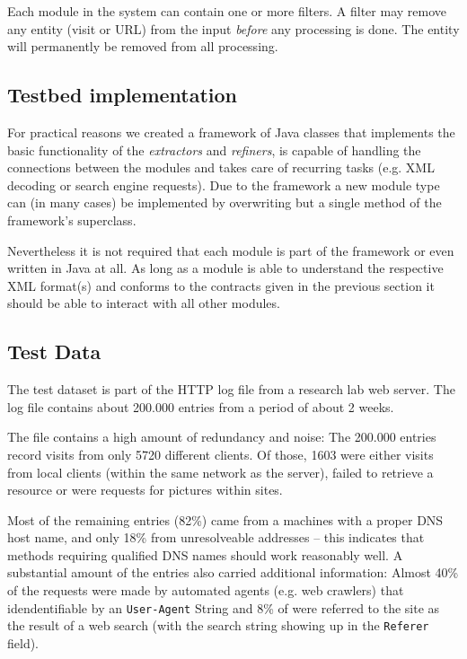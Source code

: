 \documentclass[a4paper]{danarticle}
\begin{document}
      Each module in the system can contain one or more filters. A filter may 
      remove any entity (visit or URL) from the input \textit{before} any 
      processing is done. The entity will permanently be removed from all 
      processing.
    \subsection{Testbed implementation}
      For practical reasons we created a framework of Java classes that 
      implements the basic functionality of the \textit{extractors} and 
      \textit{refiners}, is capable of handling the connections between the 
      modules and takes care of recurring tasks (e.g. XML decoding or search 
      engine requests). Due to the framework a new module type can (in many 
      cases) be implemented by overwriting but a single method of the 
      framework's superclass.
      
      Nevertheless it is not required that each module is part of the 
      framework or even written in Java at all. As long as a module is able to 
      understand the respective XML format(s) and conforms to the contracts 
      given in the previous section it should be able to interact with all 
      other modules.
    \subsection{Test Data}
      The test dataset is part of the HTTP log file from a research lab
      web server. The log file contains about 200.000 entries from a period of
      about 2 weeks.
      
      The file contains a high amount of redundancy and noise: The 200.000 
      entries record visits from only 5720 different clients. Of those, 1603 
      were either visits from local clients (within the same network as the 
      server), failed to retrieve a resource or were requests for pictures 
      within sites.
      
      Most of the remaining entries (82\%) came from a machines with a proper
      DNS host name, and only 18\% from unresolveable addresses -- this indicates
      that methods requiring qualified DNS names should work reasonably well. A
      substantial amount of the entries also carried additional information:
      Almost 40\% of the requests were made by automated agents (e.g. web
      crawlers) that idendentifiable by an \verb$User-Agent$ String and 8\% of
      were referred to the site as the result of a web search (with the search
      string showing up in the \verb$Referer$ field).
\end{document}
